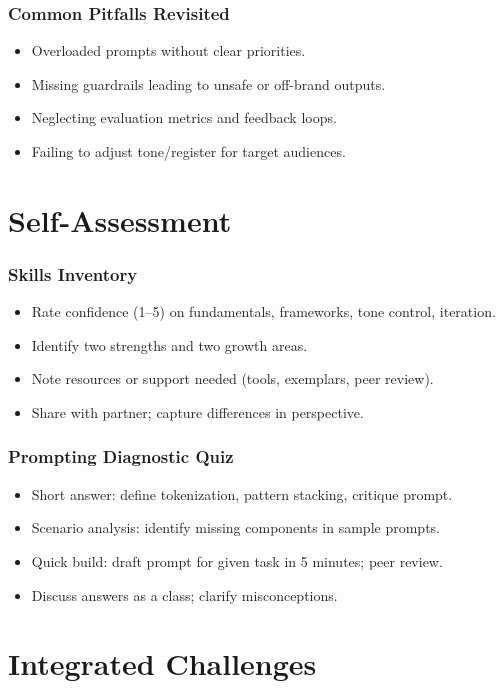 \documentclass{beamer}
\begin{document}
\begin{frame}
    \frametitle{Common Pitfalls Revisited}
    \begin{itemize}
        \item Overloaded prompts without clear priorities.
        \item Missing guardrails leading to unsafe or off-brand outputs.
        \item Neglecting evaluation metrics and feedback loops.
        \item Failing to adjust tone/register for target audiences.
    \end{itemize}
\end{frame}

\section{Self-Assessment}

\begin{frame}
    \frametitle{Skills Inventory}
    \begin{itemize}
        \item Rate confidence (1--5) on fundamentals, frameworks, tone control, iteration.
        \item Identify two strengths and two growth areas.
        \item Note resources or support needed (tools, exemplars, peer review).
        \item Share with partner; capture differences in perspective.
    \end{itemize}
\end{frame}

\begin{frame}
    \frametitle{Prompting Diagnostic Quiz}
    \begin{itemize}
        \item Short answer: define tokenization, pattern stacking, critique prompt.
        \item Scenario analysis: identify missing components in sample prompts.
        \item Quick build: draft prompt for given task in 5 minutes; peer review.
        \item Discuss answers as a class; clarify misconceptions.
    \end{itemize}
\end{frame}

\section{Integrated Challenges}
\end{document}
